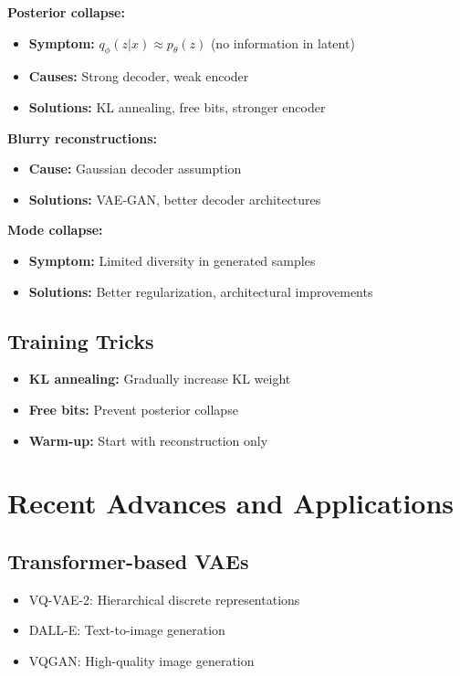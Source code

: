 \textbf{Posterior collapse:}
\begin{itemize}
    \item \textbf{Symptom:} $q_\phi(z|x) \approx p_\theta(z)$ (no information in latent)
    \item \textbf{Causes:} Strong decoder, weak encoder
    \item \textbf{Solutions:} KL annealing, free bits, stronger encoder
\end{itemize}

\textbf{Blurry reconstructions:}
\begin{itemize}
    \item \textbf{Cause:} Gaussian decoder assumption
    \item \textbf{Solutions:} VAE-GAN, better decoder architectures
\end{itemize}

\textbf{Mode collapse:}
\begin{itemize}
    \item \textbf{Symptom:} Limited diversity in generated samples
    \item \textbf{Solutions:} Better regularization, architectural improvements
\end{itemize}

\subsection{Training Tricks}

\begin{itemize}
    \item \textbf{KL annealing:} Gradually increase KL weight
    \item \textbf{Free bits:} Prevent posterior collapse
    \item \textbf{Warm-up:} Start with reconstruction only
\end{itemize}

\section{Recent Advances and Applications}

\subsection{Transformer-based VAEs}

\begin{itemize}
    \item VQ-VAE-2: Hierarchical discrete representations
    \item DALL-E: Text-to-image generation
    \item VQGAN: High-quality image generation
\end{itemize}

